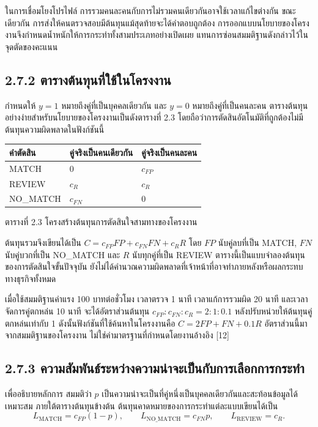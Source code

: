 \documentclass[12pt,a4paper]{report}
\begin{document}
ในการเชื่อมโยงโปรไฟล์ การรวมคนละคนกับการไม่รวมคนเดียวกันอาจใช้เวลาแก้ไขต่างกัน ขณะเดียวกัน การส่งให้คนตรวจสอบมีต้นทุนแม้สุดท้ายจะได้คำตอบถูกต้อง การออกแบบนโยบายของโครงงานจึงกำหนดน้ำหนักให้การกระทำทั้งสามประเภทอย่างเปิดเผย แทนการซ่อนสมมติฐานดังกล่าวไว้ในจุดตัดของคะแนน

\subsection*{2.7.2 ตารางต้นทุนที่ใช้ในโครงงาน}
กำหนดให้ $y=1$ หมายถึงคู่ที่เป็นบุคคลเดียวกัน และ $y=0$ หมายถึงคู่ที่เป็นคนละคน ตารางต้นทุนอย่างง่ายสำหรับนโยบายของโครงงานเป็นดังตารางที่ 2.3 โดยถือว่าการตัดสินอัตโนมัติที่ถูกต้องไม่มีต้นทุนความผิดพลาดในฟังก์ชันนี้

\begin{center}\small
\begin{tabularx}{\linewidth}{p{3.2cm}XX}
\toprule
คำตัดสิน & คู่จริงเป็นคนเดียวกัน & คู่จริงเป็นคนละคน \\
\midrule
MATCH & 0 & $c_{FP}$ \\
REVIEW & $c_R$ & $c_R$ \\
NO\_MATCH & $c_{FN}$ & 0 \\
\bottomrule
\end{tabularx}
\par ตารางที่ 2.3 โครงสร้างต้นทุนการตัดสินใจสามทางของโครงงาน
\end{center}

ต้นทุนรวมจึงเขียนได้เป็น $C=c_{FP}FP+c_{FN}FN+c_RR$ โดย $FP$ นับคู่ลบที่เป็น MATCH, $FN$ นับคู่บวกที่เป็น NO\_MATCH และ $R$ นับทุกคู่ที่เป็น REVIEW ตารางนี้เป็นแบบจำลองต้นทุนของการตัดสินใจขั้นปัจจุบัน ยังไม่ได้คำนวณความผิดพลาดที่เจ้าหน้าที่อาจทำภายหลังหรือผลกระทบทางธุรกิจทั้งหมด

เมื่อใช้สมมติฐานค่าแรง 100 บาทต่อชั่วโมง เวลาตรวจ 1 นาที เวลาแก้การรวมผิด 20 นาที และเวลาจัดการคู่ตกหล่น 10 นาที จะได้อัตราส่วนต้นทุน $c_{FP}:c_{FN}:c_R=2:1:0.1$ หลังปรับหน่วยให้ต้นทุนคู่ตกหล่นเท่ากับ 1 ดังนั้นฟังก์ชันที่ใช้ค้นหาในโครงงานคือ $C=2FP+FN+0.1R$ อัตราส่วนนี้มาจากสมมติฐานของโครงงาน ไม่ใช่ค่ามาตรฐานที่กำหนดโดยงานอ้างอิง [12]

\subsection*{2.7.3 ความสัมพันธ์ระหว่างความน่าจะเป็นกับการเลือกการกระทำ}
เพื่ออธิบายหลักการ สมมติว่า $p$ เป็นความน่าจะเป็นที่คู่หนึ่งเป็นบุคคลเดียวกันและสะท้อนข้อมูลได้เหมาะสม ภายใต้ตารางต้นทุนข้างต้น ต้นทุนคาดหมายของการกระทำแต่ละแบบเขียนได้เป็น
\begin{equation*}
L_{\mathrm{MATCH}}=c_{FP}(1-p),\qquad
L_{\mathrm{NO\_MATCH}}=c_{FN}p,\qquad
L_{\mathrm{REVIEW}}=c_R.
\end{equation*}
\end{document}
